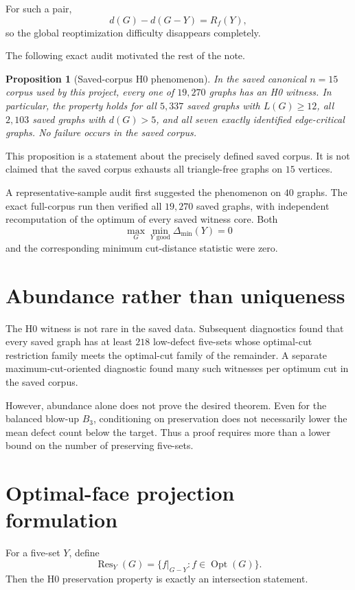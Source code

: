 \documentclass[11pt]{article}
\newtheorem{proposition}{Proposition}
\newcommand{\dd}{d}
\newcommand{\Opt}{\operatorname{Opt}}
\begin{document}
For such a pair,
\[
\dd(G)-\dd(G-Y)=R_f(Y),
\]
so the global reoptimization difficulty disappears completely.

The following exact audit motivated the rest of the note.

\begin{proposition}[Saved-corpus H0 phenomenon]
In the saved canonical $n=15$ corpus used by this project, every one of
$19{,}270$ graphs has an H0 witness.  In particular, the property holds
for all $5{,}337$ saved graphs with $L(G)\ge12$, all $2{,}103$ saved graphs
with $\dd(G)>5$, and all seven exactly identified edge-critical graphs.
No failure occurs in the saved corpus.
\end{proposition}

This proposition is a statement about the precisely defined saved corpus.
It is not claimed that the saved corpus exhausts all triangle-free graphs
on $15$ vertices.

A representative-sample audit first suggested the phenomenon on $40$
graphs.  The exact full-corpus run then verified all $19{,}270$ saved
graphs, with independent recomputation of the optimum of every saved
witness core.  Both
\[
\max_G\min_{Y\text{ good}}\Delta_{\min}(Y)=0
\]
and the corresponding minimum cut-distance statistic were zero.

\section{Abundance rather than uniqueness}

The H0 witness is not rare in the saved data.  Subsequent diagnostics found
that every saved graph has at least $218$ low-defect five-sets whose
optimal-cut restriction family meets the optimal-cut family of the
remainder.  A separate maximum-cut-oriented diagnostic found many such
witnesses per optimum cut in the saved corpus.

However, abundance alone does not prove the desired theorem.  Even for the
balanced blow-up $B_3$, conditioning on preservation does not necessarily
lower the mean defect count below the target.  Thus a proof requires more
than a lower bound on the number of preserving five-sets.

\section{Optimal-face projection formulation}

For a five-set $Y$, define
\[
\operatorname{Res}_Y(G)=
\{f|_{G-Y}: f\in\Opt(G)\}.
\]
Then the H0 preservation property is exactly an intersection statement.
\end{document}
